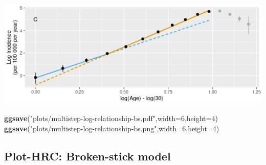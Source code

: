 \documentclass[
]{article}
\newenvironment{Shaded}{\begin{snugshade}}{\end{snugshade}}
\newcommand{\DataTypeTok}[1]{\textcolor[rgb]{0.13,0.29,0.53}{#1}}
\newcommand{\DecValTok}[1]{\textcolor[rgb]{0.00,0.00,0.81}{#1}}
\newcommand{\KeywordTok}[1]{\textcolor[rgb]{0.13,0.29,0.53}{\textbf{#1}}}
\newcommand{\NormalTok}[1]{#1}
\newcommand{\StringTok}[1]{\textcolor[rgb]{0.31,0.60,0.02}{#1}}
\begin{document}
\includegraphics{multistep-model-comparison_files/figure-latex/broken-stick-figure-1.png}

\begin{Shaded}
\begin{Highlighting}[]
\KeywordTok{ggsave}\NormalTok{(}\StringTok{"plots/multistep-log-relationship-bs.pdf"}\NormalTok{,}\DataTypeTok{width=}\DecValTok{6}\NormalTok{,}\DataTypeTok{height=}\DecValTok{4}\NormalTok{)}
\KeywordTok{ggsave}\NormalTok{(}\StringTok{"plots/multistep-log-relationship-bs.png"}\NormalTok{,}\DataTypeTok{width=}\DecValTok{6}\NormalTok{,}\DataTypeTok{height=}\DecValTok{4}\NormalTok{)}
\end{Highlighting}
\end{Shaded}

\hypertarget{plot-hrc-broken-stick-model}{%
\subsection{Plot-HRC: Broken-stick
model}\label{plot-hrc-broken-stick-model}}
\end{document}
